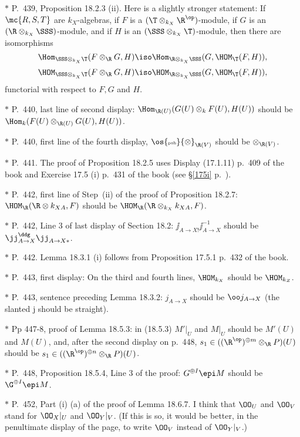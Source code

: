 \documentclass[12pt]{article}
\theoremstyle{remark}
\theoremstyle{definition}
\begin{document}
\nn$*$ P.~439, Proposition 18.2.3 (ii). Here is a slightly stronger statement: If $\mc{R,S,T}$ are $k_X$-algebras, if $F$ is a $(\T\otimes_{k_X}\R^{\op})$-module, if $G$ is an $(\R\otimes_{k_X}\SSS)$-module, and if $H$ is an $(\SSS\otimes_{k_X}\T)$-module, then there are isomorphisms 
$$
\Hom_{\SSS\otimes_{k_X}\T}(F\otimes_\R G,H)\iso
\Hom_{\R\otimes_{k_X}\SSS}(G,\HOM_\T(F,H)), 
$$ 
$$
\HOM_{\SSS\otimes_{k_X}\T}(F\otimes_\R G,H)\iso
\HOM_{\R\otimes_{k_X}\SSS}(G,\HOM_\T(F,H)), 
$$ 
functorial with respect to $F,G$ and $H$.

\nn$*$ P.~440, last line of second display: $\Hom_{\R(U)}(G(U)\otimes_kF(U),H(U))$ should be $\Hom_k(F(U)\otimes_{\R(U)}G(U),H(U))$. 

\nn$*$ P.~440, first line of the fourth display, $\os{\text{\tiny psh}}{\otimes}_{\R(V)}$ should be $\otimes_{\R(V)}$. 

\nn$*$ P.~441. The proof of Proposition 18.2.5 uses Display (17.1.11) p.~409 of the book and Exercise 17.5 (i) p.~431 of the book (see \S\ref{175i} p.~).  

\nn$*$ P.~442, first line of Step~(ii) of the proof of Proposition 18.2.7: $\HOM_\R(\R\otimes k_{XA},F)$ should be $\HOM_\R(\R\otimes_{k_X}k_{XA},F)$. 

\nn$*$ P.~442, Line 3 of last display of Section 18.2: $\jj_{A\to X!}\jj_{A\to X}^{-1}$ should be $\jj_{A\to X}^\ddg\jj_{A\to X*}$. 

\nn$*$ P.~442. Lemma 18.3.1 (i) follows from Proposition 17.5.1 p.~432 of the book. 

\nn$*$ P.~443, first display: On the third and fourth lines, $\HOM_{k_X}$ should be $\HOM_{k_Z}$. 

\nn$*$ P.~443, sentence preceding Lemma 18.3.2: $j_{A\to X}$ should be $\oo j_{A\to X}$ (the slanted j should be straight). 

\nn$*$ Pp 447-8, proof of Lemma 18.5.3: in (18.5.3) $M'|_U$ and $M|_U$ should be $M'(U)$ and $M(U)$, and, after the second display on p.~448, $s_1\in((\R^{\op})^{\oplus m}\otimes_\R P)(U)$ should be $s_1\in((\R^{\op})^{\oplus n}\otimes_\R P)(U)$.

\nn$*$ P.~448, Proposition 18.5.4, Line 3 of the proof: $G^{\oplus I}\epi M$ should be $\G^{\oplus I}\epi M$.

\nn$*$ P.~452, Part (i) (a) of the proof of Lemma 18.6.7. I think that $\OO_U$ and $\OO_V$ stand for $\OO_X|_U$ and $\OO_Y|_V$. (If this is so, it would be better, in the penultimate display of the page, to write $\OO_V$ instead of $\OO_Y|_V$.) 
\end{document}
